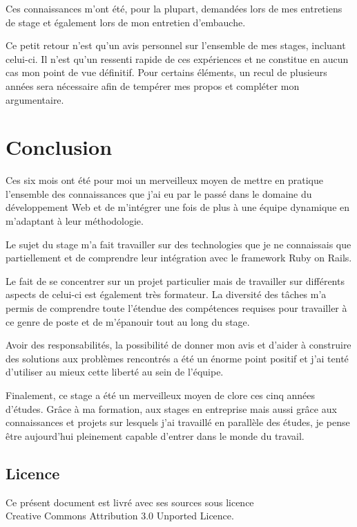 \documentclass[12pt,a4paper]{book}
\begin{document}
Ces connaissances m'ont été, pour la plupart, demandées lors de mes entretiens de stage et également lors de  mon entretien d'embauche.

Ce petit retour n'est qu'un avis personnel sur l'ensemble de mes stages, incluant celui-ci. Il n'est qu'un ressenti rapide de ces expériences et ne constitue en aucun cas mon point de vue définitif. Pour certains éléments, un recul de plusieurs années sera nécessaire afin de tempérer mes propos et compléter mon argumentaire.

\chapter*{Conclusion}

Ces six mois ont été pour moi un merveilleux moyen de mettre en pratique l'ensemble des connaissances que j'ai eu par le passé dans le domaine du développement Web et de m'intégrer une fois de plus à une équipe dynamique en m'adaptant à leur méthodologie.

Le sujet du stage m'a fait travailler sur des technologies que je ne connaissais que partiellement et de comprendre leur intégration avec le framework Ruby on Rails.

Le fait de se concentrer sur un projet particulier mais de travailler sur différents aspects de celui-ci est également très formateur. La diversité des tâches m'a permis de comprendre toute l'étendue des compétences requises pour travailler à ce genre de poste et de m'épanouir tout au long du stage.

Avoir des responsabilités, la possibilité de donner mon avis et d'aider à construire des solutions aux problèmes rencontrés a été un énorme point positif et j'ai tenté d'utiliser au mieux cette liberté au sein de l'équipe.

Finalement, ce stage a été un merveilleux moyen de clore ces cinq années d'études. Grâce à ma formation, aux stages en entreprise mais aussi grâce aux connaissances et projets sur lesquels j'ai travaillé en parallèle des études, je pense être aujourd'hui pleinement capable d'entrer dans le monde du travail.

\listoffigures

\printglossaries

\newpage
{}
\section*{Licence}
\begin{center}
Ce présent document est livré avec ses sources sous licence\\
\ccby Creative Commons Attribution 3.0 Unported Licence.
\end{center}
\end{document}

